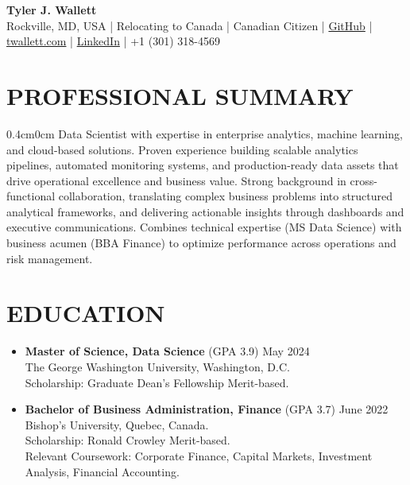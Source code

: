 \documentclass[a4paper,9pt]{extarticle}
\begin{document}
\thispagestyle{firstpage}

\begin{center}
\textbf{\Huge Tyler J. Wallett }\\[3pt] %
Rockville, MD, USA | Relocating to Canada | Canadian Citizen | \href{https://github.com/twallett}{GitHub} | \href{https://www.twallett.com}{twallett.com} | \href{https://www.linkedin.com/in/twallett/}{LinkedIn} | +1 (301) 318-4569  %
\end{center}

\section*{PROFESSIONAL SUMMARY}

\begin{adjustwidth}{0.4cm}{0cm}
Data Scientist with expertise in enterprise analytics, machine learning, and cloud-based solutions. Proven experience building scalable analytics pipelines, automated monitoring systems, and production-ready data assets that drive operational excellence and business value. Strong background in cross-functional collaboration, translating complex business problems into structured analytical frameworks, and delivering actionable insights through dashboards and executive communications. Combines technical expertise (MS Data Science) with business acumen (BBA Finance) to optimize performance across operations and risk management.
\end{adjustwidth}


\section*{EDUCATION}

\begin{itemize}[leftmargin=0.4cm, label={}]
    \item \textbf{Master of Science, Data Science} (GPA 3.9) \hfill May 2024 \\ 
    The George Washington University, Washington, D.C. \\ 
    Scholarship: Graduate Dean's Fellowship Merit-based.
\end{itemize}

\noindent
\begin{itemize}[leftmargin=0.4cm, label={}]
    \item \textbf{Bachelor of Business Administration, Finance} (GPA 3.7) \hfill June 2022 \\
    Bishop's University, Quebec, Canada. \\ 
    Scholarship: Ronald Crowley Merit-based. \\
    Relevant Coursework: Corporate Finance, Capital Markets, Investment Analysis, Financial Accounting.
\end{itemize}
\end{document}
